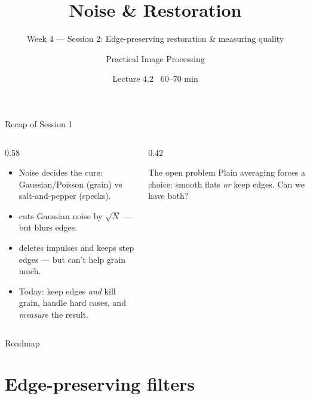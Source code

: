 \documentclass[10pt,aspectratio=169]{beamer}
\title{Noise \& Restoration}
\subtitle{Week 4 — Session 2: Edge-preserving restoration \& measuring quality}
\author{Practical Image Processing}
\date{Lecture 4.2 \textbullet\ 60--70 min}
\begin{document}
\maketitle

\begin{frame}{Recap of Session 1}
  \begin{columns}[T]
    \begin{column}{0.58\textwidth}
      \begin{itemize}
        \item Noise  decides the cure: Gaussian/Poisson (grain) vs salt-and-pepper (specks).
        \item {} cuts Gaussian noise by $\sqrt{N}$ — but blurs edges.
        \item {} deletes impulses and keeps step edges — but can't help grain much.
        \item \alert{Today:} keep edges \emph{and} kill grain, handle hard cases, and \emph{measure} the result.
      \end{itemize}
    \end{column}
    \begin{column}{0.42\textwidth}
      \begin{alertblock}{The open problem}
        Plain averaging forces a choice: smooth flats \emph{or} keep edges. Can we have both?
      \end{alertblock}
    \end{column}
  \end{columns}
\end{frame}

\begin{frame}{Roadmap}\tableofcontents\end{frame}

\section{Edge-preserving filters}
\end{document}
